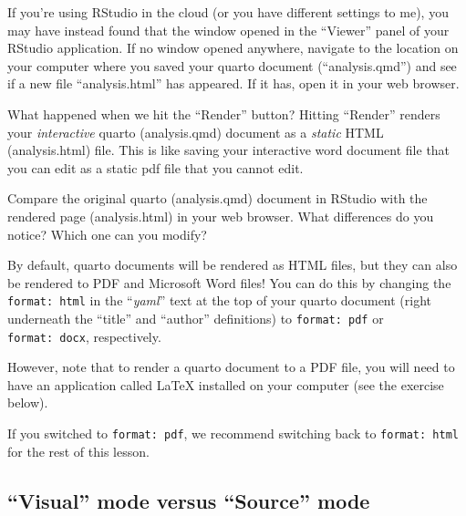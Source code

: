 \documentclass[
  letterpaper,
  DIV=11,
  numbers=noendperiod]{scrreprt}
\begin{document}
If you're using RStudio in the cloud (or you have different settings to
me), you may have instead found that the window opened in the ``Viewer''
panel of your RStudio application. If no window opened anywhere,
navigate to the location on your computer where you saved your quarto
document (``analysis.qmd'') and see if a new file ``analysis.html'' has
appeared. If it has, open it in your web browser.

What happened when we hit the ``Render'' button? Hitting ``Render''
renders your \emph{interactive} quarto (analysis.qmd) document as a
\emph{static} HTML (analysis.html) file. This is like saving your
interactive word document file that you can edit as a static pdf file
that you cannot edit.

Compare the original quarto (analysis.qmd) document in RStudio with the
rendered page (analysis.html) in your web browser. What differences do
you notice? Which one can you modify?

\begin{tcolorbox}[enhanced jigsaw, rightrule=.15mm, toptitle=1mm, title=\textcolor{quarto-callout-tip-color}{\faLightbulb}\hspace{0.5em}{Rendering quarto as PDF and Microsoft Word documents}, leftrule=.75mm, bottomtitle=1mm, colbacktitle=quarto-callout-tip-color!10!white, coltitle=black, titlerule=0mm, opacityback=0, colframe=quarto-callout-tip-color-frame, arc=.35mm, opacitybacktitle=0.6, bottomrule=.15mm, left=2mm, breakable, toprule=.15mm, colback=white]

By default, quarto documents will be rendered as HTML files, but they
can also be rendered to PDF and Microsoft Word files! You can do this by
changing the \texttt{format:\ html} in the ``\emph{yaml}'' text at the
top of your quarto document (right underneath the ``title'' and
``author'' definitions) to \texttt{format:\ pdf} or
\texttt{format:\ docx}, respectively.

However, note that to render a quarto document to a PDF file, you will
need to have an application called LaTeX installed on your computer (see
the exercise below).

If you switched to \texttt{format:\ pdf}, we recommend switching back to
\texttt{format:\ html} for the rest of this lesson.

\end{tcolorbox}

\subsection{``Visual'' mode versus ``Source''
mode}\label{visual-mode-versus-source-mode}
\end{document}
